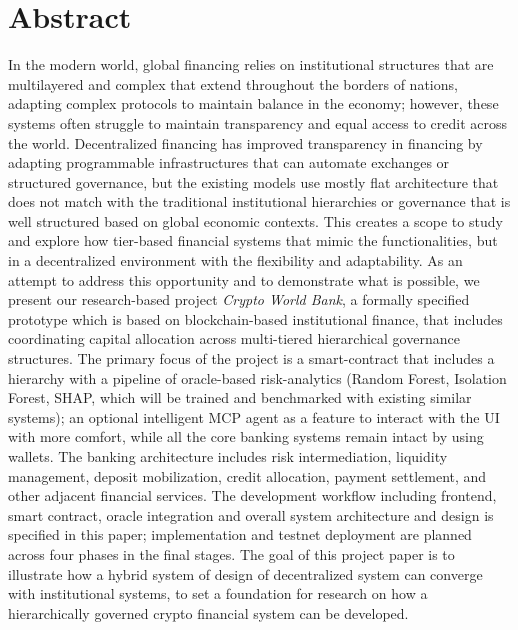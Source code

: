 \documentclass[12pt,a4paper]{report}
\begin{document}
\newpage
\thispagestyle{empty}

\chapter*{Abstract}
{}

In the modern world, global financing relies on institutional structures that are multilayered and complex that extend throughout the borders of nations, adapting complex protocols to maintain balance in the economy; however, these systems often struggle to maintain transparency and equal access to credit across the world. Decentralized financing has improved transparency in financing by adapting programmable infrastructures that can automate exchanges or structured governance, but the existing models use mostly flat architecture that does not match with the traditional institutional hierarchies or governance that is well structured based on global economic contexts. This creates a scope to study and explore how tier-based financial systems that mimic the functionalities, but in a decentralized environment with the flexibility and adaptability. As an attempt to address this opportunity and to demonstrate what is possible, we present our research-based project \textit{Crypto World Bank}, a formally specified prototype which is based on blockchain-based institutional finance, that includes coordinating capital allocation across multi-tiered hierarchical governance structures. The primary focus of the project is a smart-contract that includes a hierarchy with a pipeline of oracle-based risk-analytics (Random Forest, Isolation Forest, SHAP, which will be trained and benchmarked with existing similar systems); an optional intelligent MCP agent as a feature to interact with the UI with more comfort, while all the core banking systems remain intact by using wallets. The banking architecture includes risk intermediation, liquidity management, deposit mobilization, credit allocation, payment settlement, and other adjacent financial services. The development workflow including frontend, smart contract, oracle integration and overall system architecture and design is specified in this paper; implementation and testnet deployment are planned across four phases in the final stages. The goal of this project paper is to illustrate how a hybrid system of design of decentralized system can converge with institutional systems, to set a foundation for research on how a hierarchically governed crypto financial system can be developed.
\end{document}
